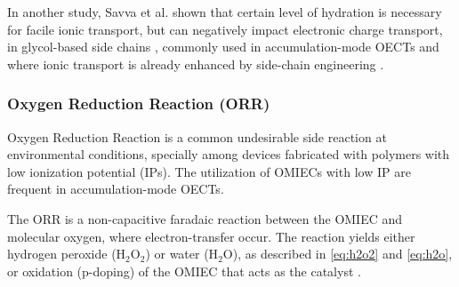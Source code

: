 
In another study, Savva et al. shown that certain level of hydration is necessary for facile ionic transport, but can negatively impact electronic charge transport, in glycol-based side chains \cite{savvaBalancingIonicElectronic2020}, commonly used in accumulation-mode OECTs and where ionic transport is already enhanced by side-chain engineering \cite{moiaDesignEvaluationConjugated2019}. %


\subsubsection{Oxygen Reduction Reaction (ORR)}

Oxygen Reduction Reaction is a common undesirable side reaction at environmental conditions, specially among devices fabricated with polymers with low ionization potential (IPs). The utilization of OMIECs with low IP are frequent in accumulation-mode OECTs. 



The ORR is a non-capacitive faradaic reaction between the OMIEC and molecular oxygen, where electron-transfer occur. The reaction yields either hydrogen peroxide (H$_{2}$O$_{2}$) or water (H$_{2}$O), as described in \ref{eq:h2o2} and \ref{eq:h2o}, or oxidation (p-doping) of the OMIEC that acts as the catalyst \cite{giovannittiEnergeticControlRedoxActive2020}. 

